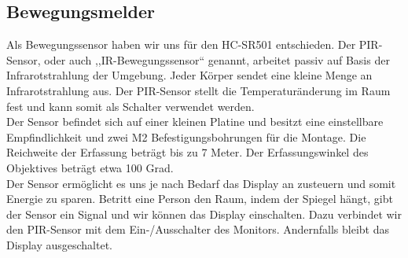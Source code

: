 \subsection{Bewegungsmelder}
Als Bewegungssensor haben wir uns für den HC-SR501 entschieden. Der PIR-Sensor, oder auch ,,IR-Bewegungssensor`` genannt, arbeitet passiv auf Basis der Infrarotstrahlung der Umgebung.  Jeder Körper sendet eine kleine Menge an Infrarotstrahlung aus. Der PIR-Sensor stellt die Temperaturänderung im Raum fest und kann somit als Schalter verwendet werden. \\
Der Sensor befindet sich auf einer kleinen Platine und besitzt eine einstellbare Empfindlichkeit und zwei M2 Befestigungsbohrungen für die Montage. Die Reichweite der Erfassung beträgt bis zu 7 Meter. Der Erfassungswinkel des Objektives beträgt etwa 100 Grad. \\
Der Sensor ermöglicht es uns je nach Bedarf das Display an zusteuern und somit Energie zu sparen. Betritt eine Person den Raum, indem der Spiegel hängt, gibt der Sensor ein Signal und wir können das Display einschalten. Dazu verbindet wir den PIR-Sensor mit dem Ein-/Ausschalter des Monitors. Andernfalls bleibt das Display ausgeschaltet. \\

